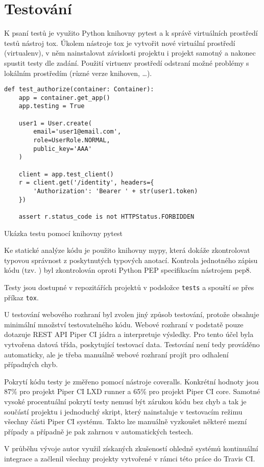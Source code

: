 \chapter{Testování}

K psaní testů je využito Python knihovny pytest a k správě virtuálních prostředí testů nástroj tox.
Úkolem nástroje tox je vytvořit nové virtuální prostředí (virtualenv), v něm nainstalovat závislosti projektu i projekt samotný a nakonec spustit testy dle zadání.
Použití virtuenv prostředí odstraní možné problémy s lokálním prostředím (různé verze knihoven, \ldots).

\begin{listing}[ht]
\begin{verbatim}
def test_authorize(container: Container):
    app = container.get_app()
    app.testing = True

    user1 = User.create(
        email='user1@email.com',
        role=UserRole.NORMAL,
        public_key='AAA'
    )

    client = app.test_client()
    r = client.get('/identity', headers={
        'Authorization': 'Bearer ' + str(user1.token)
    })

    assert r.status_code is not HTTPStatus.FORBIDDEN
\end{verbatim}
\caption{Ukázka testu pomocí knihovny pytest}
\end{listing}

Ke statické analýze kódu je použito knihovny mypy, která dokáže zkontrolovat typovou správnost z poskytnutých typových anotací.
Kontrola jednotného zápisu kódu (tzv. ) byl zkontrolován oproti Python PEP specifikacím nástrojem pep8.

Testy jsou dostupné v repozitářích projektů v podsložce \verb|tests| a spouští se přes příkaz \verb|tox|.

U testování webového rozhraní byl zvolen jiný způsob testování, protože obsahuje minimální množství testovatelného kódu.
Webové rozhraní v podstatě pouze dotazuje REST API Piper CI jádra a interpretuje výsledky.
Pro tento účel byla vytvořena  datová třída, poskytující testovací data.
Testování není tedy prováděno automaticky, ale je třeba manuálně webové rozhraní projít pro odhalení případných chyb.


Pokrytí kódu testy je změřeno pomocí nástroje coveralls.
Konkrétní hodnoty jsou 87\% pro projekt Piper CI LXD runner a 65\% pro projekt Piper CI core.
Samotné vysoké procentuální pokrytí testy nemusí být zárukou kódu bez chyb a tak je součástí projektu i jednoduchý skript, který nainstaluje v testovacím režimu všechny části Piper CI systému.
Takto lze manuálně vyzkoušet některé mezní případy a případně je pak zahrnou v automatických testech.

V průběhu vývoje autor využil získaných zkušeností ohledně systémů kontinuální integrace a začlenil všechny projekty vytvořené v rámci této práce do Travis CI.


